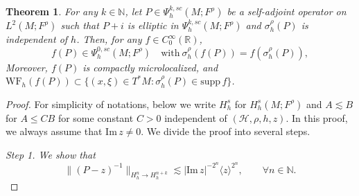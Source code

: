 \documentclass[11pt,oneside,reqno]{amsart}
\newcommand\N{\ensuremath{\mathbb{N}}}
\newcommand\R{\ensuremath{\mathbb{R}}}
\newtheorem{theorem}{Theorem}[section]
\theoremstyle{definition}
\numberwithin{equation}{section}
\theoremstyle{plain}
\begin{document}
\begin{theorem}\label{mainthmofquantized}
For any $k \in \mathbb{N}$, let $P\in \Psi^{k,sc}_h(M;F^\rho)$ be a self-adjoint operator on $L^2(M;F^{\rho})$ such that $P+i$ is elliptic in $\Psi^{k,sc}_h(M;F^\rho)$ and $\sigma_{h}^{\rho}(P)$ is independent of $h$. Then, for any $f\in C_{0}^{\infty}(\R)$, 
\begin{equation}
f(P) \in \Psi^{0,sc}_{h}(M;F^\rho) \quad \mathrm{with} \ \sigma_{h}^{\rho}(f(P))=f(\sigma_{h}^{\rho}(P)),
\end{equation}
Moreover, $f(P)$ is compactly microlocalized, and $\mathrm{WF}_{h}(f(P))\subset \{(x,\xi)\in T^*M: \sigma^\rho_{h}(P) \in \mathrm{supp}\,f\}$.
\end{theorem}
\begin{proof}
For simplicity of notations, below we write $H^s_h$ for $H^s_h(M;F^\rho)$ and $A\lesssim B$ for $A\leq CB$ for some constant $C>0$ independent of $(\mathcal{H},\rho,h,z)$. In this proof, we always assume that $\mathrm{Im} \, z \neq 0$. We divide the proof into several steps.

\emph{Step 1. We show that}
\begin{equation}\label{sobolevnormofresolvent}
\|(P-z)^{-1}\|_{H^{n}_h\to H^{n+k}_{h}}\lesssim |\mathrm{Im} \, z|^{-2^n} \langle z\rangle^{2^n}
 , \qquad \forall n\in \N.
\end{equation}


\end{proof}
\end{document}
